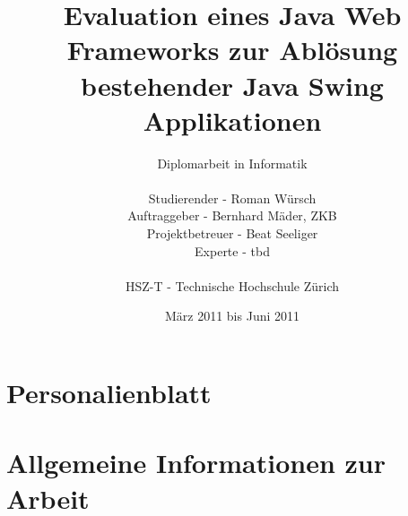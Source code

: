 \documentclass[
11pt, %
a4paper, %
BCOR25mm, %
DIV14, %
footsepline = false, %
headsepline, %
twoside, %
openright,
abstracton, %
listof=totocnumbered, %
bibliography=totocnumbered %
]{scrreprt}
\title{Evaluation eines Java Web Frameworks zur Ablösung bestehender Java Swing
Applikationen}
\author{Diplomarbeit in Informatik\\
    \\
    Studierender - Roman Würsch\\
	Auftraggeber - Bernhard Mäder, ZKB\\
    Projektbetreuer - Beat Seeliger\\
    Experte - tbd\\
	\\
	HSZ-T - Technische Hochschule Zürich}
\date{März 2011 bis Juni 2011}
\begin{document}
  \ifpdf
  \else
  \fi
  
  
  \maketitle
  
  \cleardoublepage
  
  
  
  
  
  \cleardoublepage
  

  
  \tableofcontents
  
  \cleardoublepage
  
  
  
  \chapter{Personalienblatt}

  
  
  \cleardoublepage
      
  
  \chapter{Allgemeine Informationen zur Arbeit}
  
\end{document}

